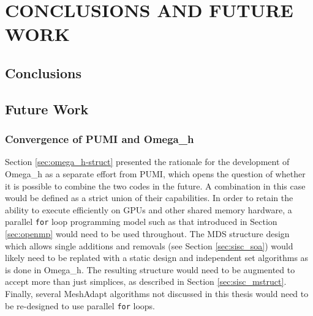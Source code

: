 
\chapter{CONCLUSIONS AND FUTURE WORK}

\section{Conclusions}

\section{Future Work}

\subsection{Convergence of PUMI and Omega\_h}
\label{sec:converge}

Section \ref{sec:omega_h-struct} presented the rationale
for the development of Omega\_h as a separate effort from PUMI,
which opens the question of whether it is possible
to combine the two codes in the future.
A combination in this case would be defined as a strict
union of their capabilities.
In order to retain the ability to execute efficiently
on GPUs and other shared memory hardware, a parallel
\texttt{for} loop programming model such as that introduced
in Section \ref{sec:openmp} would need to be used throughout.
The MDS structure design which allows single additions
and removals (see Section \ref{sec:sisc_soa}) would likely
need to be replated with a static design and independent
set algorithms as is done in Omega\_h.
The resulting structure would need to be augmented to
accept more than just simplices, as described in Section \ref{sec:sisc_mstruct}.
Finally, several MeshAdapt algorithms not discussed
in this thesis would need to be re-designed to use parallel
\texttt{for} loops.
